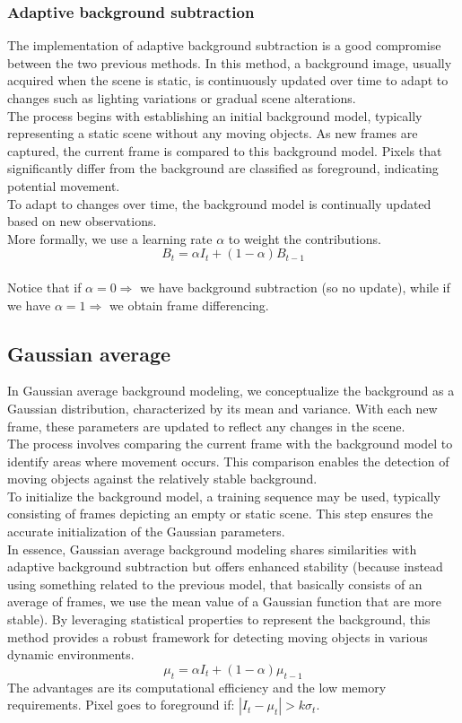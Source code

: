 \subsubsection{Adaptive background subtraction}
The implementation of adaptive background subtraction is a good compromise between the two previous methods.
In this method, a background image, usually acquired when the scene is static, is continuously updated over time to adapt to changes such as lighting variations or gradual scene alterations.
\\
The process begins with establishing an initial background model, typically representing a static scene without any moving objects. 
As new frames are captured, the current frame is compared to this background model. 
Pixels that significantly differ from the background are classified as foreground, indicating potential movement.
\\
To adapt to changes over time, the background model is continually updated based on new observations. 
\\
More formally, we use a learning rate $\alpha$ to weight the contributions.
\[ B_t=\alpha I_t + (1 -\alpha)B_{t-1}\] 
\\Notice that if $\alpha =0 \Rightarrow$ we have background subtraction (so no update), while if we have $\alpha =1 \Rightarrow$ we obtain frame differencing.
\subsection{Gaussian average}
In Gaussian average background modeling, we conceptualize the background as a Gaussian distribution, characterized by its mean and variance. 
With each new frame, these parameters are updated to reflect any changes in the scene.
\\
The process involves comparing the current frame with the background model to identify areas where movement occurs. 
This comparison enables the detection of moving objects against the relatively stable background.
\\
To initialize the background model, a training sequence may be used, typically consisting of frames depicting an empty or static scene. 
This step ensures the accurate initialization of the Gaussian parameters.
\\
In essence, Gaussian average background modeling shares similarities with adaptive background subtraction but offers enhanced stability (because instead using something related to the previous model, that basically consists of an average of frames, we use the mean value of a Gaussian function that are more stable).  
By leveraging statistical properties to represent the background, this method provides a robust framework for detecting moving objects in various dynamic environments.
\[
    \mu_{t} = \alpha I_t + (1-\alpha)\mu_{t-1}
\]
The advantages are its computational efficiency and the low memory requirements.
Pixel goes to foreground if: $|I_t - \mu_t| > k \sigma_t$.

